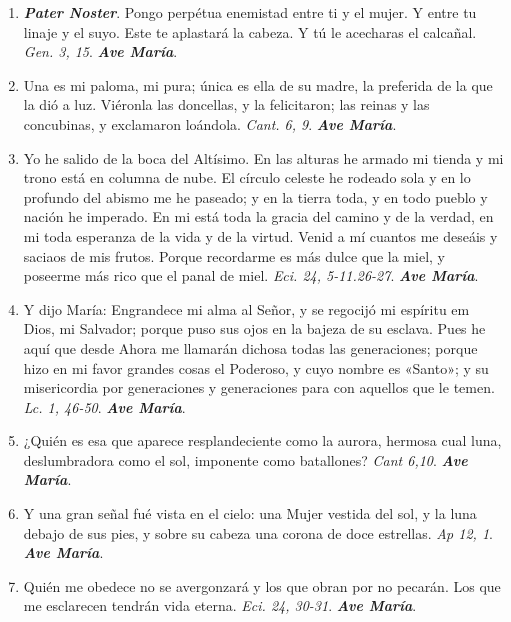 \documentclass[11pt,a4paper]{book}
\begin{document}
    \begin{enumerate}

        \item \textbf{\emph{Pater Noster}}. Pongo perpétua enemistad entre ti y el mujer. Y entre tu linaje y el suyo. Este te aplastará la cabeza.
            Y tú le acecharas el calcañal. \emph{Gen. 3, 15}. \textbf{\emph{Ave María}}.
    
        \item Una es mi paloma, mi pura; única es ella de su madre, la preferida de la que la dió a luz. Viéronla las doncellas, 
            y la felicitaron; las reinas y las concubinas, y exclamaron loándola. \emph{Cant. 6, 9}. \textbf{\emph{Ave María}}.

        \item Yo he salido de la boca del Altísimo. En las alturas he armado mi tienda y mi trono está en columna de nube. El círculo celeste he rodeado sola y en lo profundo 
            del abismo me he paseado; y en la tierra toda, y en todo pueblo y nación he imperado. En mi está toda la gracia del camino y de la verdad, en mi toda esperanza de 
            la vida y de la virtud. Venid a mí cuantos me deseáis y saciaos de mis frutos. Porque recordarme es más dulce que la miel, y poseerme más rico que el panal de miel. 
            \emph{Eci. 24, 5-11.26-27}. \textbf{\emph{Ave María}}.

        \item Y dijo María: Engrandece mi alma al Señor, y se regocijó mi espíritu em Dios, mi Salvador; porque puso sus ojos en la bajeza de su esclava. Pues he aquí que desde Ahora
            me llamarán dichosa todas las generaciones; porque hizo en mi favor grandes cosas el Poderoso, y cuyo nombre es «Santo»; y su misericordia por generaciones y generaciones
            para con aquellos que le temen. \emph{Lc. 1, 46-50}. \textbf{\emph{Ave María}}.

        \item ¿Quién es esa que aparece resplandeciente como la aurora, hermosa cual luna, deslumbradora como el sol, imponente como batallones? 
            \emph{Cant 6,10}. \textbf{\emph{Ave María}}.

        \item Y una gran señal fué vista en el cielo: una Mujer vestida del sol, y la luna debajo de sus pies, y sobre su cabeza una corona de doce estrellas. 
            \emph{Ap 12, 1}. \textbf{\emph{Ave María}}.

        \item Quién me obedece no se avergonzará y los que obran por no pecarán. Los que me esclarecen tendrán vida eterna. 
            \emph{Eci. 24, 30-31}. \textbf{\emph{Ave María}}.


\end{enumerate}
\end{document}
